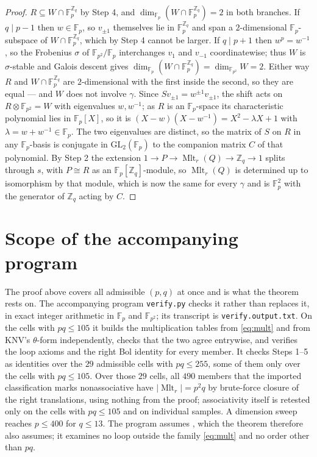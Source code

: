 \documentclass[11pt]{amsart}
\theoremstyle{definition}
\newcommand{\Mltr}{\operatorname{Mlt}_r}
\newcommand{\FF}[1]{\mathbb F_{#1}}
\newcommand{\Zq}{\mathbb Z_q}
\begin{document}
\begin{proof}
$R\subseteq W\cap\FF p^{\Zq}$ by Step 4, and $\dim_{\FF p}(W\cap\FF p^{\Zq})=2$
in both branches. If $q\mid p-1$ then $w\in\FF p$, so $v_{\pm1}$ themselves lie
in $\FF p^{\Zq}$ and span a $2$-dimensional $\FF p$-subspace of
$W\cap\FF p^{\Zq}$, which by Step 4 cannot be larger. If $q\mid p+1$ then
$w^{p}=w^{-1}$, so the Frobenius $\sigma$ of $\FF{p^{2}}/\FF p$ interchanges
$v_1$ and $v_{-1}$ coordinatewise; thus $W$ is $\sigma$-stable and Galois
descent gives $\dim_{\FF p}(W\cap\FF p^{\Zq})=\dim_{\FF{p^{2}}}W=2$. Either way
$R$ and $W\cap\FF p^{\Zq}$ are $2$-dimensional with the first inside the
second, so they are equal --- and $W$ does not involve $\gamma$. Since
$Sv_{\pm1}=w^{\pm1}v_{\pm1}$, the shift acts on $R\otimes\FF{p^{2}}=W$ with
eigenvalues $w,w^{-1}$; as $R$ is an $\FF p$-space its characteristic
polynomial lies in $\FF p[X]$, so it is
$(X-w)(X-w^{-1})=X^{2}-\lambda X+1$ with $\lambda=w+w^{-1}\in\FF p$. The two
eigenvalues are distinct, so the matrix of $S$ on $R$ in any $\FF p$-basis is
conjugate in $\mathrm{GL}_2(\FF p)$ to the companion matrix $C$ of that polynomial. By
Step 2 the extension $1\to P\to\Mltr(Q)\to\Zq\to1$ splits through $s$, with
$P\cong R$ as an $\FF p[\Zq]$-module, so $\Mltr(Q)$ is determined up to
isomorphism by that module, which is now the same for every $\gamma$ and is
$\FF p^{2}$ with the generator of $\Zq$ acting by $C$.
\end{proof}

\section{Scope of the accompanying program}

The proof above covers all admissible $(p,q)$ at once and is what the theorem
rests on. The accompanying program \texttt{verify.py} checks it rather than
replaces it, in exact integer arithmetic in $\FF p$ and $\FF{p^{2}}$; its
transcript is \texttt{verify.output.txt}. On the cells with $pq\le105$ it builds
the multiplication tables from \eqref{eq:mult} and from KNV's $\theta$-form
independently, checks that the two agree entrywise, and verifies the loop axioms
and the right Bol identity for every member. It checks Steps 1--5 as identities
over the $29$ admissible cells with $pq\le255$, some of them only over the cells
with $pq\le105$. Over those $29$ cells, all $490$ members that the imported
classification marks nonassociative have $|\Mltr|=p^{2}q$ by brute-force closure
of the right translations, using nothing from the proof; associativity itself is
retested only on the cells with $pq\le105$ and on individual samples. A
dimension sweep reaches $p\le400$ for $q\le13$. The program assumes
\cite[Theorem~1.1(ii)--(iii)]{KNV}, which the theorem therefore also assumes;
it examines no loop outside the family \eqref{eq:mult} and no order other than
$pq$.
\end{document}
